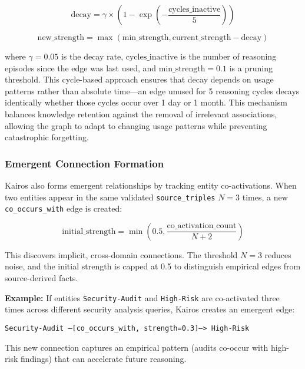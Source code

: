 \documentclass{article}
\begin{document}
\begin{equation}
\text{decay} = \gamma \times \left(1 - \exp\left(-\frac{\text{cycles\_inactive}}{5}\right)\right)
\label{eq:ltd}
\end{equation}

\begin{equation}
\text{new\_strength} = \max(\text{min\_strength}, \text{current\_strength} - \text{decay})
\end{equation}

where $\gamma = 0.05$ is the decay rate, $\text{cycles\_inactive}$ is the number of reasoning episodes since the edge was last used, and $\text{min\_strength} = 0.1$ is a pruning threshold. This cycle-based approach ensures that decay depends on usage patterns rather than absolute time---an edge unused for 5 reasoning cycles decays identically whether those cycles occur over 1 day or 1 month. This mechanism balances knowledge retention against the removal of irrelevant associations, allowing the graph to adapt to changing usage patterns while preventing catastrophic forgetting.

\subsubsection{Emergent Connection Formation}

Kairos also forms emergent relationships by tracking entity co-activations. When two entities appear in the same validated \texttt{source\_triples} $N=3$ times, a new \texttt{co\_occurs\_with} edge is created:

\begin{equation}
\text{initial\_strength} = \min\left(0.5, \frac{\text{co\_activation\_count}}{N + 2}\right)
\end{equation}

This discovers implicit, cross-domain connections. The threshold $N=3$ reduces noise, and the initial strength is capped at 0.5 to distinguish empirical edges from source-derived facts.

\textbf{Example:} If entities \texttt{Security-Audit} and \texttt{High-Risk} are co-activated three times across different security analysis queries, Kairos creates an emergent edge:

\begin{center}
\texttt{Security-Audit --[co\_occurs\_with, strength=0.3]--> High-Risk}
\end{center}

This new connection captures an empirical pattern (audits co-occur with high-risk findings) that can accelerate future reasoning.
\end{document}
